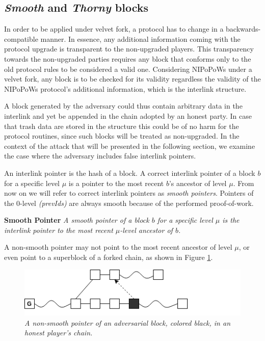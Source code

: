 \subsection{\textit{Smooth} and \textit{Thorny} blocks}
In order to be applied under velvet fork, a protocol has to change in a
backwards-compatible manner. In essence, any additional information coming
with the protocol upgrade is transparent to the non-upgraded players. This
transparency towards the non-upgraded parties requires any block that conforms
only to the old protocol rules to be considered a valid one. Considering
NIPoPoWs under a velvet fork, any block is to be checked for its validity
regardless the validity of the NIPoPoWs protocol's additional information,
which is the interlink structure.

A block generated by the adversary could thus contain arbitrary data in the interlink
and yet be appended in the chain adopted by an honest party. In case that trash
data are stored in the structure this could be of no harm for the protocol routines,
since such blocks will be treated as non-upgraded. In the context of the attack
that will be presented in the following section, we examine the case where the
adversary includes false interlink pointers. 

An interlink pointer is the hash of a block. A correct interlink pointer of a block $b$
for a specific level $\mu$ is a pointer to the most recent $b$'s ancestor of level
$\mu$. From now on we will refer to correct interlink pointers as \emph{smooth pointers}.
Pointers of the 0-level \textit{(prevIds)} are always smooth because of the
performed proof-of-work.

\begin{defn}{\textbf{Smooth Pointer}}
	\textit{A smooth pointer of a block $b$ for a specific level $\mu$ is the interlink 
	pointer to the most recent $\mu$-level ancestor of $b$.}
	\label{defn:smooth_pointer}
\end{defn}


A non-smooth pointer may not point to the most recent ancestor of level $\mu$, or even point to a superblock of a forked chain, as shown in Figure \ref{fig:false_interlink}.

\begin{figure}[h]
	\begin{center}
		\includegraphics[scale=0.6]{figures/false_interlink.png}
	\end{center}
	\caption{\textit{A non-smooth pointer of an adversarial block, colored black,
	in an honest player's chain.}}
	\label{fig:false_interlink}
\end{figure}

